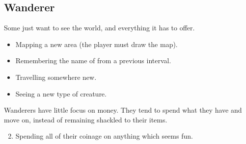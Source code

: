 \begin{multicols}{2}
\subsection{Wanderer}
\label{wanderer}

Some just want to see the world, and everything it has to offer.

\begin{itemize}

  \item
  Mapping a new area (the player must draw the map).
  \item
  Remembering the name of  from a previous \gls{interval}.
  \item
  Travelling somewhere new.
  \item
  Seeing a new type of creature.

\end{itemize}

Wanderers have little focus on money.
They tend to spend what they have and move on, instead of remaining shackled to their items.

\begin{enumerate}
  \setcounter{enumi}{1}
  \item
  Spending all of their coinage on anything which seems fun.
\end{enumerate}


\end{multicols}

\section{}
\label{xpCosts}

